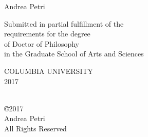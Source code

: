 \thispagestyle{empty}

\pagestyle{empty}

\begin{center}

{\Large \bf \thesistitle}

\vskip1.5in

{\Large  Andrea Petri } %



\vskip1.1in

\begin{singlespace}
\large
Submitted in partial fulfillment of the               \\
requirements for the degree                           \\
of Doctor of Philosophy                               \\
in the Graduate School of Arts and Sciences           \\
\end{singlespace}

\vskip0.5in

COLUMBIA UNIVERSITY                                   \\
2017                                                  \\

\end{center}


\clearpage

\begin{singlespace}
\begin{center}
\ \\
\vskip5.5in
\copyright 2017 \\ %
Andrea Petri\\
All Rights Reserved
\end{center}
\end{singlespace}

\clearpage